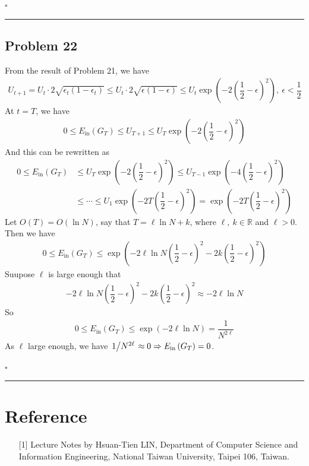 \documentclass[12pt]{article}
\newcommand*{\QEDB}{\hfill\ensuremath{\square}}
\newcommand{\ParTh}[1]{\left(#1\right)}
\newcommand{\Divide}[2]{\left.#1\middle/#2\right.}
\newcommand{\horrule}[1]{\rule{\linewidth}{#1}}
\begin{document}
\QEDB

\horrule{0.5pt}

\subsection*{Problem 22}

From the result of Problem 21, we have
\begin{align}
U_{t+1}=U_t\cdot2\sqrt{\epsilon_t\ParTh{1-\epsilon_t}}\leq U_t\cdot2\sqrt{\epsilon\ParTh{1-\epsilon}}\leq U_t\exp\ParTh{-2\ParTh{\dfrac{1}{2}-\epsilon}^2},~\epsilon<\dfrac{1}{2}
\end{align}
At $t=T$, we have
\begin{align}
0\leq E_{\text{in}}\ParTh{G_T}\leq U_{T+1}\leq U_T\exp\ParTh{-2\ParTh{\dfrac{1}{2}-\epsilon}^2}
\end{align}
And this can be rewritten as
\begin{align}
0\leq E_{\text{in}}\ParTh{G_T}&\leq U_T\exp\ParTh{-2\ParTh{\dfrac{1}{2}-\epsilon}^2}\leq U_{T-1}\exp\ParTh{-4\ParTh{\dfrac{1}{2}-\epsilon}^2}\\
&\leq\cdots\leq U_1\exp\ParTh{-2T\ParTh{\dfrac{1}{2}-\epsilon}^2}=\exp\ParTh{-2T\ParTh{\dfrac{1}{2}-\epsilon}^2}
\end{align}
Let $O\ParTh{T}=O\ParTh{\ln N}$, say that $T=\ell\ln N+k$, where $\ell,~k\in\mathbb{R}$ and $\ell>0$. Then we have
\begin{align}
0\leq E_{\text{in}}\ParTh{G_T}\leq\exp\ParTh{-2\ell\ln N\ParTh{\dfrac{1}{2}-\epsilon}^2-2k\ParTh{\dfrac{1}{2}-\epsilon}^2}
\end{align}
Suupose $\ell$ is large enough that
\begin{align}
-2\ell\ln N\ParTh{\dfrac{1}{2}-\epsilon}^2-2k\ParTh{\dfrac{1}{2}-\epsilon}^2\approx-2\ell\ln N
\end{align}
So
\begin{align}
0\leq E_{\text{in}}\ParTh{G_T}\leq\exp\ParTh{-2\ell\ln N}=\dfrac{1}{N^{2\ell}}
\end{align}
As $\ell$ large enough, we have $\Divide{1}{N^{2\ell}}\approx0\Rightarrow E_{\text{in}}\ParTh{G_T}=0$.

\QEDB

\horrule{0.5pt}

\section*{Reference}

\begin{enumerate}

\item[{[1]}] Lecture Notes by Hsuan-Tien LIN, Department of Computer Science and Information Engineering, National Taiwan University, Taipei 106, Taiwan.

\end{enumerate}
\end{document}
